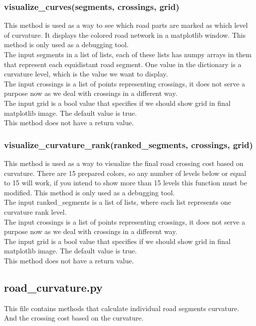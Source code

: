 \documentclass[oneside]{article}
\begin{document}
            \subsubsection{visualize\_curves(segments, crossings, grid)}
            This method is used as a way to see which road parts are marked as which level of curvature. It displays the colored road network in a matplotlib window. This method is only used as a debugging tool.\\            
            The input segments in a list of lists, each of these lists has numpy arrays in them that represent each equidistant road segment. One value in the dictionary is a curvature level, which is the value we want to display.\\
            The input crossings is a list of points representing crossings, it does not serve a purpose now as we deal with crossings in a different way.\\
            The input grid is a bool value that specifies if we should show grid in final matplotlib image. The default value is true.\\
            This method does not have a return value.

            \subsubsection{visualize\_curvature\_rank(ranked\_segments, crossings, grid)}
            This method is used as a way to visualize the final road crossing cost based on curvature. There are 15 prepared colors, so any number of levels below or equal to 15 will work, if you intend to show more than 15 levels this function must be modified. This method is only used as a debugging tool.\\
            The input ranked\_segments is a list of lists, where each list represents one curvature rank level.\\
            The input crossings is a list of points representing crossings, it does not serve a purpose now as we deal with crossings in a different way.\\
            The input grid is a bool value that specifies if we should show grid in final matplotlib image. The default value is true.\\
            This method does not have a return value.

        \subsection{road\_curvature.py}
        This file contains methods that calculate individual road segments curvature. And the crossing cost based on the curvature.
\end{document}
